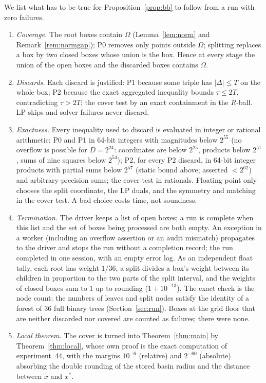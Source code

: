 \documentclass[11pt]{amsart}
\theoremstyle{definition}
\begin{document}
We list what has to be true for Proposition~\ref{prop:bb} to follow from a run with zero failures.
\begin{enumerate}[label=(S\arabic*)]
\item \emph{Coverage.} The root boxes contain $\Omega$ (Lemma~\ref{lem:norm} and Remark~\ref{rem:normgap}); P0 removes only points outside $\Omega$; splitting replaces a box by two closed boxes whose union is the box. Hence at every stage the union of the open boxes and the discarded boxes contains $\Omega$.
\item \emph{Discards.} Each discard is justified: P1 because some triple has $\lvert\Delta\rvert \le T$ on the whole box; P2 because the exact aggregated inequality bounds $\tau \le 2T$, contradicting $\tau > 2T$; the cover test by an exact containment in the $R$-ball. LP skips and solver failures never discard.
\item \emph{Exactness.} Every inequality used to discard is evaluated in integer or rational arithmetic: P0 and P1 in 64-bit integers with magnitudes below $2^{55}$ (no overflow is possible for $D = 2^{24}$: coordinates are below $2^{25}$, products below $2^{51}$, sums of nine squares below $2^{54}$); P2, for every P2 discard, in 64-bit integer products with partial sums below $2^{57}$ (static bound above; asserted $<2^{62}$) and arbitrary-precision sums; the cover test in rationals. Floating point only chooses the split coordinate, the LP duals, and the symmetry and matching in the cover test. A bad choice costs time, not soundness. %
\item \emph{Termination.} The driver keeps a list of open boxes; a run is complete when this list and the set of boxes being processed are both empty. An exception in a worker (including an overflow assertion or an audit mismatch) propagates to the driver and stops the run without a completion record; the run completed in one session, with an empty error log. As an independent float tally, each root has weight $1/36$, a split divides a box's weight between its children in proportion to the two parts of the split interval, and the weights of closed boxes sum to $1$ up to rounding ($1 + 10^{-13}$). The exact check is the node count: the numbers of leaves and split nodes satisfy the identity of a forest of $36$ full binary trees (Section~\ref{sec:run}). Boxes at the grid floor that are neither discarded nor covered are counted as failures; there were none. %
\item \emph{Local theorem.} The cover is turned into Theorem~\ref{thm:main} by Theorem~\ref{thm:local}, whose own proof is the exact computation of experiment~44, with the margins $10^{-6}$ (relative) and $2^{-60}$ (absolute) absorbing the double rounding of the stored basin radius and the distance between $\tilde x$ and $x^*$.
\end{enumerate}
\end{document}
